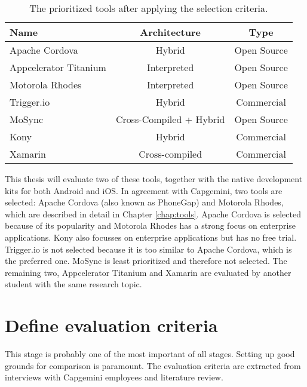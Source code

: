 \begin{table}[h!]
    \begin{center}
        \begin{tabular}{lcc}
            \hline
            Name                  & Architecture            & Type        \\
            \hline 
            Apache Cordova        & Hybrid                  & Open Source \\
            Appcelerator Titanium & Interpreted             & Open Source \\
            Motorola Rhodes       & Interpreted             & Open Source \\
            Trigger.io            & Hybrid                  & Commercial  \\
            MoSync                & Cross-Compiled + Hybrid & Open Source \\
            Kony                  & Hybrid                  & Commercial  \\
            Xamarin               & Cross-compiled          & Commercial  \\
            \hline
        \end{tabular}
        \caption{The prioritized tools after applying the selection criteria.}
        \label{tab:tools}
    \end{center}
\end{table}

This thesis will evaluate two of these tools, together with the native development kits for both Android and iOS. In agreement with Capgemini, two tools are selected: Apache Cordova (also known as PhoneGap) and Motorola Rhodes, which are described in detail in Chapter \ref{chap:tools}. Apache Cordova is selected because of its popularity and Motorola Rhodes has a strong focus on enterprise applications. Kony also focusses on enterprise applications but has no free trial. Trigger.io is not selected because it is too similar to Apache Cordova, which is the preferred one. MoSync is least prioritized and therefore not selected. The remaining two, Appcelerator Titanium and Xamarin are evaluated by another student with the same research topic. 

\section{Define evaluation criteria}

This stage is probably one of the most important of all stages. Setting up good grounds for comparison is paramount. The evaluation criteria are extracted from interviews with Capgemini employees and literature review.


